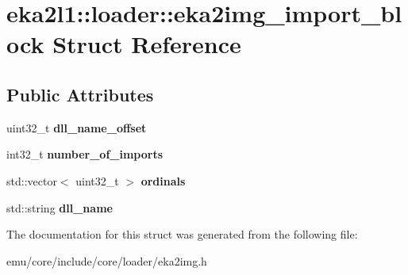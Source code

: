 \hypertarget{structeka2l1_1_1loader_1_1eka2img__import__block}{}\section{eka2l1\+:\+:loader\+:\+:eka2img\+\_\+import\+\_\+block Struct Reference}
\label{structeka2l1_1_1loader_1_1eka2img__import__block}
\subsection*{Public Attributes}
\begin{DoxyCompactItemize}
\item 
\mbox{\label{structeka2l1_1_1loader_1_1eka2img__import__block_ae65856e62ff38241de7ea98d746278c3}} 
uint32\+\_\+t {\bfseries dll\+\_\+name\+\_\+offset}
\item 
\mbox{\label{structeka2l1_1_1loader_1_1eka2img__import__block_ab9163029509790e21baa8a45dee1ca04}} 
int32\+\_\+t {\bfseries number\+\_\+of\+\_\+imports}
\item 
\mbox{\label{structeka2l1_1_1loader_1_1eka2img__import__block_a233753a88f34006c7ac29962a8ea2683}} 
std\+::vector$<$ uint32\+\_\+t $>$ {\bfseries ordinals}
\item 
\mbox{\label{structeka2l1_1_1loader_1_1eka2img__import__block_a2ff6809623bf41a9bc9963a8897c672c}} 
std\+::string {\bfseries dll\+\_\+name}
\end{DoxyCompactItemize}


The documentation for this struct was generated from the following file\+:\begin{DoxyCompactItemize}
\item 
emu/core/include/core/loader/eka2img.\+h\end{DoxyCompactItemize}

